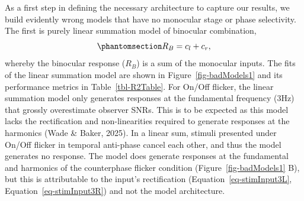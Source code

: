 \documentclass[
  12pt,
]{article}
\begin{document}
As a first step in defining the necessary architecture to capture our
results, we build evidently wrong models that have no monocular stage or
phase selectivity. The first is purely linear summation model of
binocular combination,
\begin{equation}\phantomsection\label{eq-linearSumModel}{
R_B = c_l+c_r,
}\end{equation} whereby the binocular response (\(R_B\)) is a sum of the
monocular inputs. The fits of the linear summation model are shown in
Figure~\ref{fig-badModels1} and its performance metrics in
Table~\ref{tbl-R2Table}. For On/Off flicker, the linear summation model
only generates responses at the fundamental frequency (3Hz) that grossly
overestimate observer SNRs. This is to be expected as this model lacks
the rectification and non-linearities required to generate responses at
the harmonics (Wade \& Baker, 2025). In a linear sum, stimuli presented
under On/Off flicker in temporal anti-phase cancel each other, and thus
the model generates no response. The model does generate responses at
the fundamental and harmonics of the counterphase flicker condition
(Figure~\ref{fig-badModels1} B), but this is attributable to the input's
rectification
(Equation~\ref{eq-stimInput3L}, Equation~\ref{eq-stimInput3R}) and not
the model architecture.
\end{document}
